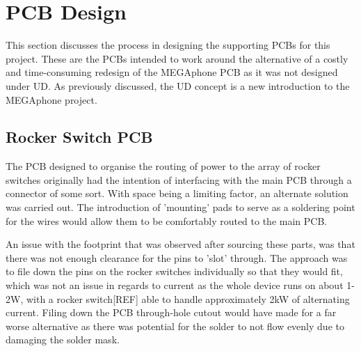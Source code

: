 
\section{PCB Design}
This section discusses the process in designing the supporting PCBs for this project.
These are the PCBs intended to work around the alternative of a costly and time-consuming redesign of the MEGAphone PCB as it was not designed under UD.
As previously discussed, the UD concept is a new introduction to the MEGAphone project.

\subsection{Rocker Switch PCB}

The PCB designed to organise the routing of power to the array of rocker switches originally had the intention of interfacing with the main PCB through a connector of some sort.
With space being a limiting factor, an alternate solution was carried out.
The introduction of 'mounting' pads to serve as a soldering point for the wires would allow them to be comfortably routed to the main PCB.

An issue with the footprint that was observed after sourcing these parts, was that there was not enough clearance for the pins to 'slot' through.
The approach was to file down the pins on the rocker switches individually so that they would fit, which was not an issue in regards to current as the whole device runs on about 1-2W, with a rocker switch[REF] able to handle approximately 2kW of alternating current.
Filing down the PCB through-hole cutout would have made for a far worse alternative as there was potential for the solder to not flow evenly due to damaging the solder mask. %

